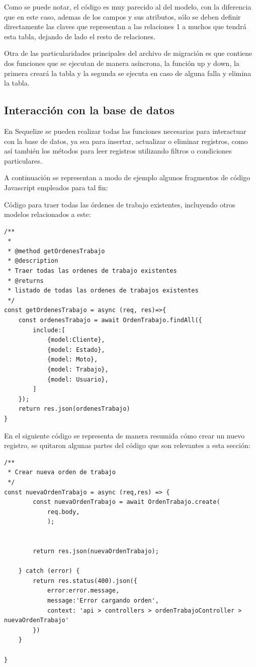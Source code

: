 Como se puede notar, el código es muy parecido al del modelo, con la diferencia que en este caso, ademas de los campos y sus atributos, sólo se deben definir directamente las claves que representan a las relaciones 1 a muchos que tendrá esta tabla, dejando de lado el resto de relaciones. 

Otra de las particularidades principales del archivo de migración es que contiene dos funciones que se ejecutan de manera asíncrona, la función up y down, la primera creará la tabla y la segunda se ejecuta en caso de alguna falla y elimina la tabla. 
  

\subsection{Interacción con la base de datos}
\label{subsec:interaccionbasededatos}

En Sequelize se pueden realizar todas las funciones necesarias para interactuar con la base de datos, ya sea para insertar, actualizar o eliminar registros, como así también los métodos para leer registros utilizando filtros o condiciones particulares.

A continuación se representan a modo de ejemplo algunos fragmentos de código Javascript empleados para tal fin:

Código para traer todas las órdenes de trabajo existentes, incluyendo otros modelos relacionados a este:

\begin{lstlisting}[caption= Código para traer datos en Sequelize.]
/**
 * 
 * @method getOrdenesTrabajo 
 * @description
 * Traer todas las ordenes de trabajo existentes
 * @returns
 * listado de todas las ordenes de trabajos existentes
 */
const getOrdenesTrabajo = async (req, res)=>{
    const ordenesTrabajo = await OrdenTrabajo.findAll({
        include:[
            {model:Cliente},
            {model: Estado},
            {model: Moto},
            {model: Trabajo},
            {model: Usuario},
        ]
    });
    return res.json(ordenesTrabajo)
}
\end{lstlisting}

En el siguiente código se representa de manera resumida cómo crear un nuevo registro, se quitaron algunas partes del código que son relevantes a esta sección:

\begin{lstlisting}[label=cod:nuevoregistro,caption=Código resumido para crear nuevo registro en la base de datos.]
/**
 * Crear nueva orden de trabajo
 */
const nuevaOrdenTrabajo = async (req,res) => {
        const nuevaOrdenTrabajo = await OrdenTrabajo.create(
            req.body, 
            );
  

        return res.json(nuevaOrdenTrabajo);
        
    } catch (error) {
        return res.status(400).json({
            error:error.message, 
            message:'Error cargando orden',
            context: 'api > controllers > ordenTrabajoController > nuevaOrdenTrabajo'
        })  
    }
    
}
\end{lstlisting}

